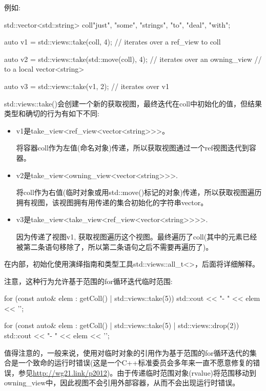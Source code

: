例如:

\begin{cpp}
std::vector<std::string> coll{"just", "some", "strings", "to", "deal", "with"};

auto v1 = std::views::take(coll, 4); // iterates over a ref_view to coll

auto v2 = std::views::take(std::move(coll), 4); // iterates over an owning_view
// to a local vector<string>

auto v3 = std::views::take(v1, 2); // iterates over v1
\end{cpp}

std::views::take()会创建一个新的获取视图，最终迭代在coll中初始化的值，但结果类型和确切的行为有如下不同:

\begin{itemize}
\item
v1是take\_view<ref\_view<vector<string>{}>{}>。

将容器coll作为左值(命名对象)传递，所以获取视图通过一个ref视图迭代到容器。

\item
v2是take\_view<owning\_view<vector<string>{}>{}>.

将coll作为右值(临时对象或用std::move()标记的对象)传递，所以获取视图遍历拥有视图，该视图拥有用传递的集合初始化的字符串vector。

\item
v3是take\_view<take\_view<ref\_view<vector<string>{}>{}>{}>.

因为传递了视图v1, 获取视图遍历这个视图。最终遍历了coll(其中的元素已经被第二条语句移除了，所以第二条语句之后不需要再遍历了)。
\end{itemize}

在内部，初始化使用演绎指南和类型工具std::views::all\_t<>，后面将详细解释。

注意，这种行为允许基于范围的for循环迭代临时范围:

\begin{cpp}
for (const auto& elem : getColl() | std::views::take(5)) {
	std::cout << "- " << elem << '\n';
}

for (const auto& elem : getColl() | std::views::take(5) | std::views::drop(2)) {
	std::cout << "- " << elem << '\n';
}
\end{cpp}

值得注意的，一般来说，使用对临时对象的引用作为基于范围的for循环迭代的集合是一个致命的运行时错误(这是一个C++标准委员会多年来一直不愿意修复的错误，参见\url{http://wg21.link/p2012})。由于传递临时范围对象(rvalue)将范围移动到owning\_view中，因此视图不会引用外部容器，从而不会出现运行时错误。


